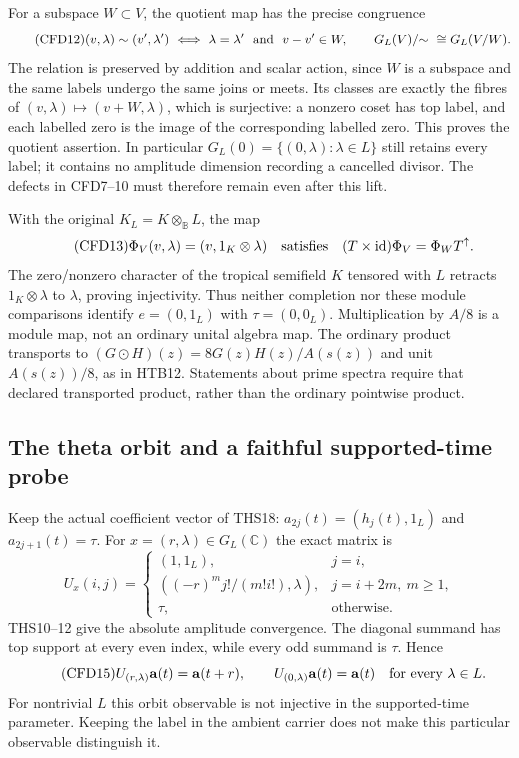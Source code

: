 \documentclass[11pt]{article}
\theoremstyle{definition}
\begin{document}
For a subspace $W\subset V$, the quotient map has the precise
congruence
\begin{equation}\tag{CFD12}
 (v,\lambda)\sim(v',\lambda')
 \ \Longleftrightarrow\
 \lambda=\lambda'\ \hbox{ and }\ v-v'\in W,
 \qquad
 G_L(V)/{\sim}\ \cong G_L(V/W).
\end{equation}
The relation is preserved by addition and scalar action, since $W$
is a subspace and the same labels undergo the same joins or meets.
Its classes are exactly the fibres of $(v,\lambda)\mapsto
(v+W,\lambda)$, which is surjective: a nonzero coset has top label,
and each labelled zero is the image of the corresponding labelled
zero. This proves the quotient assertion. In particular
$G_L(0)=\{(0,\lambda):\lambda\in L\}$ still retains every label;
it contains no amplitude dimension recording a cancelled divisor.
The defects in CFD7--10 must therefore remain even after this lift.

With the original $K_L=K\otimes_{\mathbb B}L$, the map
\begin{equation}\tag{CFD13}
 \Phi_V(v,\lambda)=(v,1_K\otimes\lambda)
 \quad\hbox{satisfies}\quad
 (T\times\mathrm{id})\Phi_V=\Phi_W T^\uparrow.
\end{equation}
The zero/nonzero character of the tropical semifield $K$ tensored
with $L$ retracts $1_K\otimes\lambda$ to $\lambda$, proving
injectivity. Thus neither completion nor these module comparisons
identify $e=(0,1_L)$ with $\tau=(0,0_L)$. Multiplication by $A/8$
is a module map, not an ordinary unital algebra map. The ordinary
product transports to $(G\odot H)(z)=8G(z)H(z)/A(s(z))$ and unit
$A(s(z))/8$, as in HTB12. Statements about prime spectra require
that declared transported product, rather than the ordinary
pointwise product.

\subsection{The theta orbit and a faithful supported-time probe}

Keep the actual coefficient vector of THS18:
$a_{2j}(t)=(h_j(t),1_L)$ and $a_{2j+1}(t)=\tau$.
For $x=(r,\lambda)\in G_L(\mathbb C)$ the exact matrix is
\begin{equation}\tag{CFD14}
 U_x(i,j)=
 \begin{cases}
 (1,1_L),&j=i,\\
 ((-r)^m j!/(m!i!),\lambda),&j=i+2m,\ m\ge1,\\
 \tau,&\text{otherwise}.
 \end{cases}
\end{equation}
THS10--12 give the absolute amplitude convergence. The diagonal
summand has top support at every even index, while every odd
summand is $\tau$. Hence
\begin{equation}\tag{CFD15}
 U_{(r,\lambda)}\mathbf a(t)=\mathbf a(t+r),\qquad
 U_{(0,\lambda)}\mathbf a(t)=\mathbf a(t)
                    \quad\hbox{for every }\lambda\in L.
\end{equation}
For nontrivial $L$ this orbit observable is not injective in the
supported-time parameter. Keeping the label in the ambient carrier
does not make this particular observable distinguish it.
\end{document}
